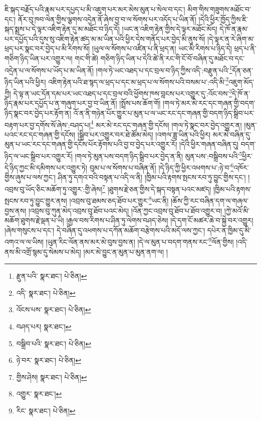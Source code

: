ཇི་སྐད་བརྗོད་པའི་རྣམ་པར་དཔྱད་པ་མི་འཇུག་པར་མར་མེས་མུན་པ་སེལ་བ་དང་། མིག་གིས་གཟུགས་མཐོང་བ་དང་། ནོར་བུ་ཁབ་ལེན་གྱིས་ལྕགས་འདྲེན་ནོ་ཞེས་བྱ་བ་ལ་སོགས་པར་འདོད་པ་ཡིན་ནོ། །དེའི་ཕྱིར་ཁྱོད་ཀྱིས་ཇི་སྐད་སྨྲས་པ་དེ་ལྟར་འཇིག་རྟེན་དུ་མ་མཐོང་བ་ཉིད་དོ། །ཡང་ན་འཇིག་རྟེན་གྱིས་དེ་ལྟར་མཐོང་མོད། དེ་ཁོ་ན་རྣམ་པར་དཔྱོད་པའི་དུས་སུ་འཇིག་རྟེན་ཚད་མ་མ་ཡིན་པའི་ཕྱིར་དེས་གནོད་པར་བྱེད་མི་ནུས་སོ། །དེ་ལྟར་ན་རེ་ཞིག་མ་ཕྲད་པར་སྣང་བར་བྱེད་པ་མི་རིགས་སོ། །ཡུལ་ལ་སོགས་པ་འཛིན་པ་ནི་ཕྲད་ན། ཡང་མི་རིགས་པ་ཉིད་དེ། ཕྲད་པ་ནི་གཅིག་ཉིད་ཡིན་པར་འགྱུར་ལ། གང་གི་ཚེ། གཅིག་ཉིད་ཡིན་པ་དེའི་ཚེ་ནི་རང་གི་ངོ་བོ་བཞིན་དུ་མཐོང་བ་དང་འདྲེན་པ་ལ་སོགས་པ་ཡོད་པ་མ་ཡིན་ནོ། །གལ་ཏེ་ཡང་འཐད་པ་དང་བྲལ་བ་ཉིད་ཀྱིས་འདི་:བརྫུན་པའི་\footnote{རྫུན་པའི་  སྣར་ཐང་།  པེ་ཅིན། }དོན་ཅན་ཉིད་ཡིན་པའི་ཕྱིར། འཇིག་རྟེན་པའི་ཐ་སྙད་ལ་ཕྲད་པ་དང་མ་ཕྲད་པ་ལ་སོགས་པའི་བསམ་པ་:འདི་མི་\footnote{འདི་  སྣར་ཐང་།  པེ་ཅིན། }འཇུག་མོད་ཀྱི། དེ་ལྟ་ན་ཡང་དོན་དམ་པར་ཡང་འཐད་པ་དང་བྲལ་བའི་ཕྱོགས་ཁས་བླངས་པར་འགྱུར་དུ་:འོང་བས་\footnote{འོངས་པས་  སྣར་ཐང་།  པེ་ཅིན། }དེ་ཁོ་ན་ཉིད་རྣམ་པར་དཔྱོད་པ་ན་གཞུག་པར་བྱ་བ་ཡིན་ནོ། །སྤྲོས་པས་ཆོག་གོ། །གལ་ཏེ་མར་མེ་རང་དང་གཞན་གྱི་བདག་ཉིད་སྣང་བར་བྱེད་པར་རྟོག་ན། འོ་ན་ནི་གཉེན་པོར་གྱུར་པ་མུན་པ་ལ་ཡང་རང་དང་གཞན་གྱི་བདག་ཉིད་སྒྲིབ་པར་བརྟག་པར་བྱ་དགོས་སོ་ཞེས་:བཤད་པ།\footnote{བཤད་པར།  སྣར་ཐང་། } མར་མེ་རང་དང་གཞན་གྱི་དངོས། །གལ་ཏེ་སྣང་བར་བྱེད་འགྱུར་ན། །མུན་པའང་རང་དང་གཞན་གྱི་དངོས། །སྒྲིབ་པར་འགྱུར་བར་ཐེ་ཚོམ་མེད། །འགལ་ཟླ་ཡིན་པའི་ཕྱིར། མར་མེ་བཞིན་དུ་མུན་པ་ཡང་རང་དང་གཞན་གྱི་དངོས་པོར་རྟོགས་པའི་བྱ་བ་བྱེད་པར་འགྱུར་རོ། །དེའི་ཕྱིར་གཞན་བཞིན་དུ། བདག་ཉིད་ལ་ཡང་སྒྲིབ་པར་འགྱུར་རོ། །གལ་ཏེ་མུན་པས་བདག་ཉིད་སྒྲིབ་པར་བྱེད་ན་ནི། མུན་པས་:བསྒྲིབས་པའི་\footnote{བསྒྲིབ་པའི་  སྣར་ཐང་།  པེ་ཅིན། }ཕྱིར་དེ་ཉིད་ཀྱང་མི་དམིགས་པར་འགྱུར་ཏེ། བུམ་པ་ལ་སོགས་པ་བཞིན་ནོ། །དེ་ཉིད་ཀྱི་ཕྱིར་འཕགས་པ་:ཉེ་བ་\footnote{ཉེ་བར་  སྣར་ཐང་།  པེ་ཅིན། }འཁོར་གྱིས་ཞུས་པ་ལས་ཀྱང་། ཤིན་ཏུ་དགའ་བའི་བསྟན་པ་འདི་ལ་ནི། །ཁྱིམ་པའི་རྟགས་སྤངས་རབ་ཏུ་བྱུང་གྱིས་དང་། །འབྲས་བུ་ཡོད་ཅིང་མཆོག་ཏུ་འགྱུར་:གྱི་ཞེས།\footnote{གྱིས་ཤེས།  སྣར་ཐང་།  པེ་ཅིན། } །ཐུགས་རྗེ་ཅན་གྱིས་དེ་སྐད་བསྟན་པའང་མཛད། །ཁྱིམ་པའི་རྟགས་སྤངས་རབ་ཏུ་བྱུང་གྱུར་ནས། །འབྲས་བུ་ཐམས་ཅད་ཐོབ་པར་གྱུར་\footnote{འགྱུར་  སྣར་ཐང་། }ཡང་ནི། །ཆོས་ཀྱི་རང་བཞིན་དག་ལ་གཞལ་བྱས་ནས། །འབྲས་བུ་ཀུན་མེད་འབྲས་བུ་ཐོབ་པའང་མེད། །འོན་ཀྱང་འབྲས་བུ་ཐོབ་པ་ཐོབ་འགྱུར་བ། །ཀྱེ་མའོ་མི་མཆོག་ཐུགས་རྗེ་ལྡན་པ་ཡི། །རྒྱལ་བས་རིགས་པ་ཤིན་ཏུ་ལེགས་བཤད་ཅེས། །དེ་དག་ངོ་མཚར་ཆེ་བ་སྐྱེ་བར་འགྱུར། །ཞེས་གསུངས་པ་དང་། དེ་བཞིན་དུ་འཕགས་པ་དཀོན་མཆོག་བརྩེགས་པའི་མདོ་ལས་ཀྱང་། དཔེར་ན་ཁྱིམ་དུ་མི་འགའ་ལ་ལ་ཡིས། །ཡུན་རིང་ལོན་ནས་མར་མེ་བུས་བྱས་ན། །དེ་ལ་མུན་པ་བདག་གནས་རང་\footnote{རིང་  སྣར་ཐང་།  པེ་ཅིན། }ལོན་གྱིས། །འདི་ནས་མི་འགྲོ་སྙམ་དུ་སེམས་པ་མེད། །མར་མེ་བྱུང་ན་མུན་པ་མུན་ནག་ལ། །
